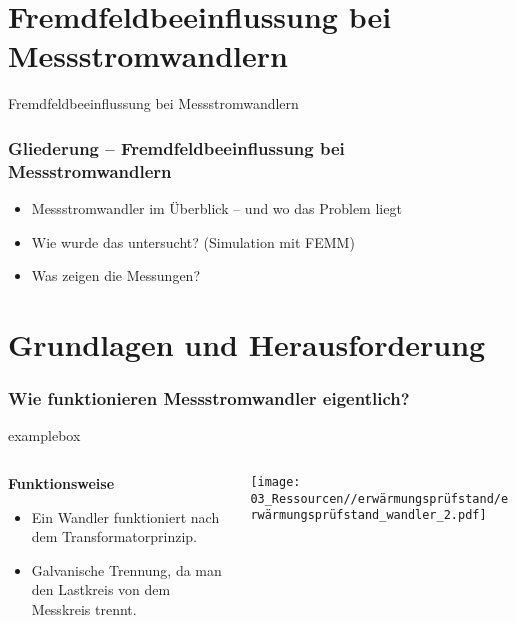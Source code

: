 \section{Fremdfeldbeeinflussung bei Messstromwandlern}

\begin{frame}
    \centering
    \vfill
    {\Huge Fremdfeldbeeinflussung bei Messstromwandlern}
    \vfill
\end{frame}


\begin{frame}
    \frametitle{Gliederung – Fremdfeldbeeinflussung bei Messstromwandlern}
    \begin{itemize}
        \Large
        \item Messstromwandler im Überblick – und wo das Problem liegt
        \item Wie wurde das untersucht? (Simulation mit FEMM)
        \item Was zeigen die Messungen?
    \end{itemize}
\end{frame}



\section*{Grundlagen und Herausforderung}

\begin{frame}
    \frametitle{Wie funktionieren Messstromwandler eigentlich?}
    \begin{beamercolorbox}[wd=\textwidth, sep=1ex, rounded=true, shadow=true]{examplebox}
        \begin{columns}[T]
            \begin{column}{0.3\textwidth}
                \textbf{Funktionsweise}
                \begin{itemize}
                    \item Ein Wandler funktioniert nach dem Transformatorprinzip.
                    \item Galvanische Trennung, da man den Lastkreis von dem Messkreis trennt.
                \end{itemize}
            \end{column}

            \begin{column}{0.55\textwidth}
                \texttt{[image: 03\_Ressourcen//erwärmungsprüfstand/erwärmungsprüfstand\_wandler\_2.pdf]}
            \end{column}
        \end{columns}
    \end{beamercolorbox}

\end{frame}


